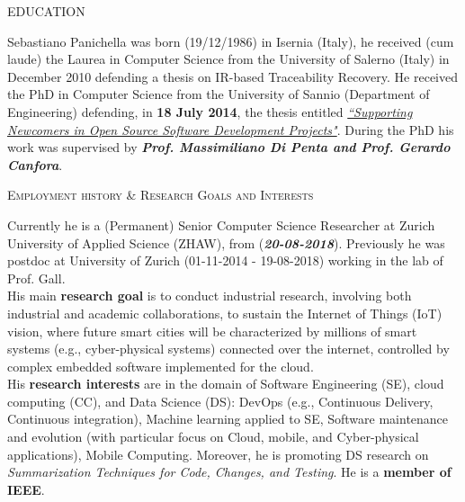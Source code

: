 \documentclass[12pt]{article}
\begin{document}
\vspace{2.5mm}
\textsc{EDUCATION}
\vspace{1.5mm}

Sebastiano Panichella was born (19/12/1986) 
in Isernia (Italy), he received (cum laude) the Laurea in Computer Science from the University of Salerno (Italy) in December 2010 defending a thesis on IR-based Traceability Recovery. 
He received the PhD in Computer Science from the University of Sannio (Department of Engineering) defending, in  \textbf{18 July 2014},  the thesis entitled  \href{http://dx.doi.org/10.1109/ICSM.2015.7332519}{\textit{``Supporting Newcomers in Open Source Software Development Projects"}}.  During the PhD his work was supervised by \textbf{\textit{Prof. Massimiliano Di Penta and Prof. Gerardo Canfora}}.

\vspace{2.5mm}
\textsc{Employment history \& Research Goals and Interests}
\vspace{1.5mm}


Currently he is a (Permanent) Senior Computer Science Researcher at Zurich University of Applied Science (ZHAW), from (\textit{\textbf{20-08-2018}}). Previously he was postdoc at University of Zurich (01-11-2014 - 19-08-2018) working in the lab of Prof. Gall. \\
His main \textbf{research goal} is to conduct industrial research, involving both industrial and academic collaborations, to sustain
the Internet of Things (IoT) vision, where future smart cities will be characterized by millions of smart systems (e.g., cyber-physical
systems) connected over the internet, controlled by complex embedded software implemented for the cloud.\\
His  \textbf{research interests} are in the domain of Software Engineering (SE), cloud computing (CC), and Data Science (DS): DevOps (e.g., Continuous Delivery, Continuous integration), Machine learning applied to SE, Software maintenance and evolution (with particular focus on Cloud, mobile, and Cyber-physical applications), Mobile Computing. Moreover, he is promoting DS research on \textit{Summarization Techniques for Code, Changes, and Testing}. He is a \textbf{member of IEEE}. 
\vspace{1mm}
\end{document}
